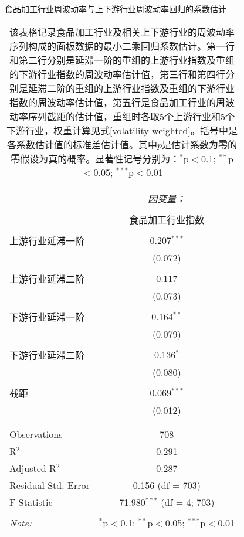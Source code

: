 \documentclass{sysuthesis}
\begin{document}
\begin{table}[!htbp] \centering 
  \caption{食品加工行业周波动率与上下游行业周波动率回归的系数估计} 
  \caption*{\footnotesize 该表格记录食品加工行业及相关上下游行业的周波动率序列构成的面板数据的最小二乘回归系数估计。第一行和第二行分别是延滞一阶的重组的上游行业指数及重组的下游行业指数的周波动率估计值，第三行和第四行分别是延滞二阶的重组的上游行业指数及重组的下游行业指数的周波动率估计值，第五行是食品加工行业的周波动率序列截距的估计值，重组时各取5个上游行业和5个下游行业，权重计算见式\ref{volatility-weighted}。括号中是各系数估计值的标准差估计值。其中$p$是估计系数为零的零假设为真的概率。显著性记号分别为：{$^{*}$p$<$0.1; $^{**}$p$<$0.05; $^{***}$p$<$0.01}} 
  \label{883111-vol-lease-square-estimation-second-order} 
  \renewcommand{\arraystretch}{0.5}
\begin{tabular}{@{\extracolsep{5pt}}lc} 
\\[-1.8ex]\hline 
\hline \\[-1.8ex] 
 & \multicolumn{1}{c}{\textit{因变量：}} \\ 
\cline{2-2} 
\\[-1.8ex] & 食品加工行业指数 \\ 
\hline \\[-1.8ex] 
 上游行业延滞一阶 & 0.207$^{***}$ \\ 
  & (0.072) \\ 
  & \\ 
 上游行业延滞二阶 & 0.117 \\ 
  & (0.073) \\ 
  & \\ 
 下游行业延滞一阶 & 0.164$^{**}$ \\ 
  & (0.079) \\ 
  & \\ 
 下游行业延滞二阶 & 0.136$^{*}$ \\ 
  & (0.080) \\ 
  & \\ 
 截距 & 0.069$^{***}$ \\ 
  & (0.012) \\ 
  & \\ 
\hline \\[-1.8ex] 
Observations & 708 \\ 
R$^{2}$ & 0.291 \\ 
Adjusted R$^{2}$ & 0.287 \\ 
Residual Std. Error & 0.156 (df = 703) \\ 
F Statistic & 71.980$^{***}$ (df = 4; 703) \\ 
\hline 
\hline \\[-1.8ex] 
\textit{Note:}  & \multicolumn{1}{r}{$^{*}$p$<$0.1; $^{**}$p$<$0.05; $^{***}$p$<$0.01} \\ 
\end{tabular} 
\end{table} 
\end{document}
